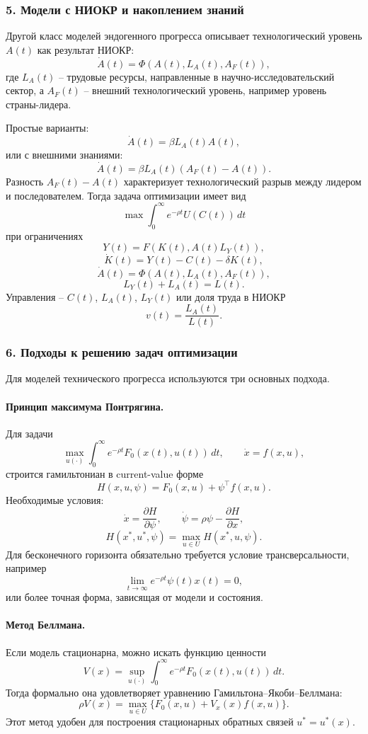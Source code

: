 \documentclass[12pt,a4paper]{article}
\begin{document}
\subsubsection*{5. Модели с НИОКР и накоплением знаний}
Другой класс моделей эндогенного прогресса описывает технологический уровень $A(t)$ как результат НИОКР:
\[
\dot A(t)=\Phi(A(t),L_A(t),A_F(t)),
\]
где $L_A(t)$ -- трудовые ресурсы, направленные в научно-исследовательский сектор, а $A_F(t)$ -- внешний технологический уровень, например уровень страны-лидера.

Простые варианты:
\[
\dot A(t)=\beta L_A(t)A(t),
\]
или с внешними знаниями:
\[
\dot A(t)=\beta L_A(t)(A_F(t)-A(t)).
\]
Разность $A_F(t)-A(t)$ характеризует технологический разрыв между лидером и последователем. Тогда задача оптимизации имеет вид
\[
\max \int_0^\infty e^{-\rho t}U(C(t))\,dt
\]
при ограничениях
\[
Y(t)=F(K(t),A(t)L_Y(t)),
\]
\[
\dot K(t)=Y(t)-C(t)-\delta K(t),
\]
\[
\dot A(t)=\Phi(A(t),L_A(t),A_F(t)),
\]
\[
L_Y(t)+L_A(t)=L(t).
\]
Управления -- $C(t)$, $L_A(t)$, $L_Y(t)$ или доля труда в НИОКР
\[
v(t)=\frac{L_A(t)}{L(t)}.
\]

\subsubsection*{6. Подходы к решению задач оптимизации}
Для моделей технического прогресса используются три основных подхода.

\paragraph{Принцип максимума Понтрягина.}
Для задачи
\[
\max_{u(\cdot)}\int_0^\infty e^{-\rho t}F_0(x(t),u(t))\,dt,
\qquad \dot x=f(x,u),
\]
строится гамильтониан в current-value форме
\[
H(x,u,\psi)=F_0(x,u)+\psi^\top f(x,u).
\]
Необходимые условия:
\[
\dot x=\frac{\partial H}{\partial \psi},\qquad
\dot\psi=\rho\psi-\frac{\partial H}{\partial x},
\]
\[
H(x^*,u^*,\psi)=\max_{u\in U}H(x^*,u,\psi).
\]
Для бесконечного горизонта обязательно требуется условие трансверсальности, например
\[
\lim_{t\to\infty}e^{-\rho t}\psi(t)x(t)=0,
\]
или более точная форма, зависящая от модели и состояния.

\paragraph{Метод Беллмана.}
Если модель стационарна, можно искать функцию ценности
\[
V(x)=\sup_{u(\cdot)}\int_0^\infty e^{-\rho t}F_0(x(t),u(t))\,dt.
\]
Тогда формально она удовлетворяет уравнению Гамильтона--Якоби--Беллмана:
\[
\rho V(x)=\max_{u\in U}\{F_0(x,u)+V_x(x)f(x,u)\}.
\]
Этот метод удобен для построения стационарных обратных связей $u^*=u^*(x)$.
\end{document}

